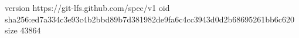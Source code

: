 version https://git-lfs.github.com/spec/v1
oid sha256:ed7a334c3e93c4b2bbd89b7d381982de9fa6c4cc3943d0d2b68695261bb6c620
size 43864
